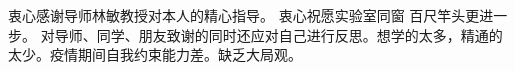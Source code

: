 \begin{acknowledgement}
    衷心感谢导师林敏教授对本人的精心指导。
    衷心祝愿实验室同窗 百尺竿头更进一步。
    对导师、同学、朋友致谢的同时还应对自己进行反思。想学的太多，精通的太少。疫情期间自我约束能力差。缺乏大局观。
\end{acknowledgement}
